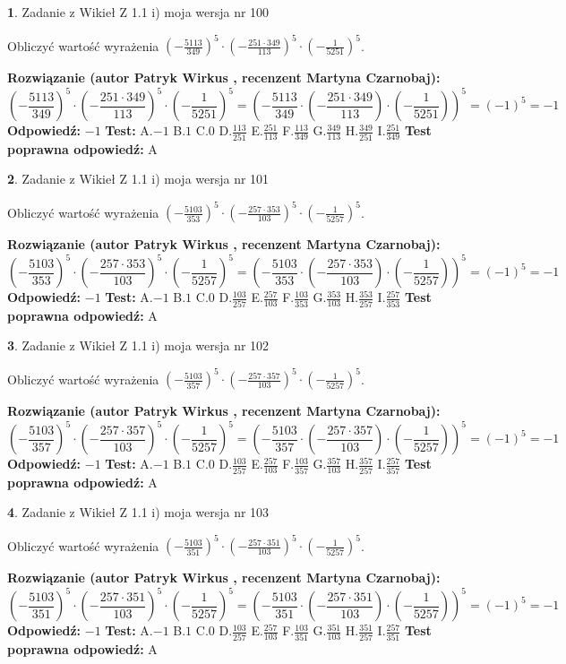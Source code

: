 \documentclass[12pt, a4paper]{article}
\theoremstyle{definition} %
\newtheorem{zad}{}
\newcommand{\zadStart}[1]{\begin{zad}#1\newline}
\newcommand{\zadStop}{\end{zad}}
\newcommand{\rozwStart}[2]{\noindent \textbf{Rozwiązanie (autor #1 , recenzent #2): }\newline}
\newcommand{\rozwStop}{\newline}
\newcommand{\odpStart}{\noindent \textbf{Odpowiedź:}\newline}
\newcommand{\odpStop}{\newline}
\newcommand{\testStart}{\noindent \textbf{Test:}\newline}
\newcommand{\testStop}{\newline}
\newcommand{\kluczStart}{\noindent \textbf{Test poprawna odpowiedź:}\newline}
\newcommand{\kluczStop}{\newline}
\begin{document}
\zadStart{Zadanie z Wikieł Z 1.1 i) moja wersja nr 100}

Obliczyć wartość wyrażenia $(-\frac{5113}{349})^{5} \cdot (-\frac{251 \cdot 349}{113})^{5} \cdot (-\frac{1}{5251})^{5}$.
\zadStop
\rozwStart{Patryk Wirkus}{Martyna Czarnobaj}
$$(-\frac{5113}{349})^{5} \cdot (-\frac{251 \cdot 349}{113})^{5} \cdot (-\frac{1}{5251})^{5} = (-\frac{5113}{349} \cdot (-\frac{251 \cdot 349}{113}) \cdot (-\frac{1}{5251}))^{5} = (-1)^{5} = -1$$
\rozwStop
\odpStart
$-1$
\odpStop
\testStart
A.$-1$ B.$1$ C.$0$ D.$\frac{113}{251}$ E.$\frac{251}{113}$
F.$\frac{113}{349}$ G.$\frac{349}{113}$
H.$\frac{349}{251}$
I.$\frac{251}{349}$
\testStop
\kluczStart
A
\kluczStop



\zadStart{Zadanie z Wikieł Z 1.1 i) moja wersja nr 101}

Obliczyć wartość wyrażenia $(-\frac{5103}{353})^{5} \cdot (-\frac{257 \cdot 353}{103})^{5} \cdot (-\frac{1}{5257})^{5}$.
\zadStop
\rozwStart{Patryk Wirkus}{Martyna Czarnobaj}
$$(-\frac{5103}{353})^{5} \cdot (-\frac{257 \cdot 353}{103})^{5} \cdot (-\frac{1}{5257})^{5} = (-\frac{5103}{353} \cdot (-\frac{257 \cdot 353}{103}) \cdot (-\frac{1}{5257}))^{5} = (-1)^{5} = -1$$
\rozwStop
\odpStart
$-1$
\odpStop
\testStart
A.$-1$ B.$1$ C.$0$ D.$\frac{103}{257}$ E.$\frac{257}{103}$
F.$\frac{103}{353}$ G.$\frac{353}{103}$
H.$\frac{353}{257}$
I.$\frac{257}{353}$
\testStop
\kluczStart
A
\kluczStop



\zadStart{Zadanie z Wikieł Z 1.1 i) moja wersja nr 102}

Obliczyć wartość wyrażenia $(-\frac{5103}{357})^{5} \cdot (-\frac{257 \cdot 357}{103})^{5} \cdot (-\frac{1}{5257})^{5}$.
\zadStop
\rozwStart{Patryk Wirkus}{Martyna Czarnobaj}
$$(-\frac{5103}{357})^{5} \cdot (-\frac{257 \cdot 357}{103})^{5} \cdot (-\frac{1}{5257})^{5} = (-\frac{5103}{357} \cdot (-\frac{257 \cdot 357}{103}) \cdot (-\frac{1}{5257}))^{5} = (-1)^{5} = -1$$
\rozwStop
\odpStart
$-1$
\odpStop
\testStart
A.$-1$ B.$1$ C.$0$ D.$\frac{103}{257}$ E.$\frac{257}{103}$
F.$\frac{103}{357}$ G.$\frac{357}{103}$
H.$\frac{357}{257}$
I.$\frac{257}{357}$
\testStop
\kluczStart
A
\kluczStop



\zadStart{Zadanie z Wikieł Z 1.1 i) moja wersja nr 103}

Obliczyć wartość wyrażenia $(-\frac{5103}{351})^{5} \cdot (-\frac{257 \cdot 351}{103})^{5} \cdot (-\frac{1}{5257})^{5}$.
\zadStop
\rozwStart{Patryk Wirkus}{Martyna Czarnobaj}
$$(-\frac{5103}{351})^{5} \cdot (-\frac{257 \cdot 351}{103})^{5} \cdot (-\frac{1}{5257})^{5} = (-\frac{5103}{351} \cdot (-\frac{257 \cdot 351}{103}) \cdot (-\frac{1}{5257}))^{5} = (-1)^{5} = -1$$
\rozwStop
\odpStart
$-1$
\odpStop
\testStart
A.$-1$ B.$1$ C.$0$ D.$\frac{103}{257}$ E.$\frac{257}{103}$
F.$\frac{103}{351}$ G.$\frac{351}{103}$
H.$\frac{351}{257}$
I.$\frac{257}{351}$
\testStop
\kluczStart
A
\kluczStop
\end{document}
